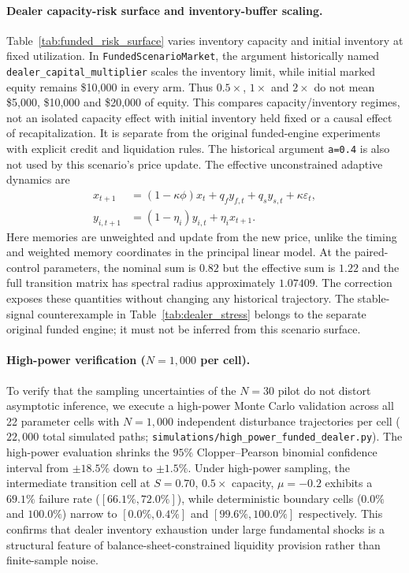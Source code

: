 \documentclass[10pt,twocolumn,letterpaper]{article}
\theoremstyle{definition}
\theoremstyle{remark}
\begin{document}
\paragraph{Dealer capacity-risk surface and inventory-buffer scaling.}
Table~\ref{tab:funded_risk_surface} varies inventory capacity and initial inventory at fixed utilization. In \texttt{FundedScenarioMarket}, the argument historically named \texttt{dealer\_capital\_multiplier} scales the inventory limit, while initial marked equity remains \$10,000 in every arm. Thus $0.5\times$, $1\times$ and $2\times$ do not mean \$5,000, \$10,000 and \$20,000 of equity. This compares capacity/inventory regimes, not an isolated capacity effect with initial inventory held fixed or a causal effect of recapitalization. It is separate from the original funded-engine experiments with explicit credit and liquidation rules.
The historical argument \texttt{a=0.4} is also not used by this scenario's price update. The effective unconstrained adaptive dynamics are
\begin{align*}
 x_{t+1} &= (1-\kappa\phi)x_t+q_f y_{f,t}+q_s y_{s,t}+\kappa\varepsilon_t, \\
 y_{i,t+1} &= (1-\eta_i)y_{i,t}+\eta_i x_{t+1}.
\end{align*}
Here memories are unweighted and update from the new price, unlike the timing and weighted memory coordinates in the principal linear model. At the paired-control parameters, the nominal sum is $0.82$ but the effective sum is $1.22$ and the full transition matrix has spectral radius approximately $1.07409$. The correction exposes these quantities without changing any historical trajectory. The stable-signal counterexample in Table~\ref{tab:dealer_stress} belongs to the separate original funded engine; it must not be inferred from this scenario surface.

\paragraph{High-power verification ($N=1{,}000$ per cell).}
To verify that the sampling uncertainties of the $N=30$ pilot do not distort asymptotic inference, we execute a high-power Monte Carlo validation across all 22 parameter cells with $N=1{,}000$ independent disturbance trajectories per cell ($22{,}000$ total simulated paths; \texttt{simulations/high\_power\_funded\_dealer.py}). The high-power evaluation shrinks the $95\%$ Clopper--Pearson binomial confidence interval from $\pm 18.5\%$ down to $\pm 1.5\%$. Under high-power sampling, the intermediate transition cell at $S=0.70$, $0.5\times$ capacity, $\mu=-0.2$ exhibits a $69.1\%$ failure rate ($[66.1\%, 72.0\%]$), while deterministic boundary cells ($0.0\%$ and $100.0\%$) narrow to $[0.0\%, 0.4\%]$ and $[99.6\%, 100.0\%]$ respectively. This confirms that dealer inventory exhaustion under large fundamental shocks is a structural feature of balance-sheet-constrained liquidity provision rather than finite-sample noise.
\end{document}
